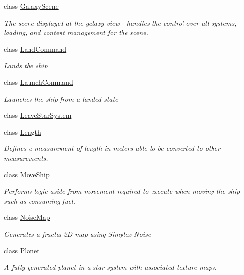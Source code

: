 \begin{DoxyCompactItemize}
class \hyperlink{class_midnight_blue_1_1_galaxy_scene}{Galaxy\+Scene}
\begin{DoxyCompactList}\small\item\em The scene displayed at the galaxy view -\/ handles the control over all systems, loading, and content management for the scene. \end{DoxyCompactList}\item 
class \hyperlink{class_midnight_blue_1_1_land_command}{Land\+Command}
\begin{DoxyCompactList}\small\item\em Lands the ship \end{DoxyCompactList}\item 
class \hyperlink{class_midnight_blue_1_1_launch_command}{Launch\+Command}
\begin{DoxyCompactList}\small\item\em Launches the ship from a landed state \end{DoxyCompactList}\item 
class \hyperlink{class_midnight_blue_1_1_leave_star_system}{Leave\+Star\+System}
\item 
class \hyperlink{class_midnight_blue_1_1_length}{Length}
\begin{DoxyCompactList}\small\item\em Defines a measurement of length in meters able to be converted to other measurements. \end{DoxyCompactList}\item 
class \hyperlink{class_midnight_blue_1_1_move_ship}{Move\+Ship}
\begin{DoxyCompactList}\small\item\em Performs logic aside from movement required to execute when moving the ship such as consuming fuel. \end{DoxyCompactList}\item 
class \hyperlink{class_midnight_blue_1_1_noise_map}{Noise\+Map}
\begin{DoxyCompactList}\small\item\em Generates a fractal 2D map using Simplex Noise \end{DoxyCompactList}\item 
class \hyperlink{class_midnight_blue_1_1_planet}{Planet}
\begin{DoxyCompactList}\small\item\em A fully-\/generated planet in a star system with associated texture maps. \end{DoxyCompactList}\item 

\end{DoxyCompactItemize}

